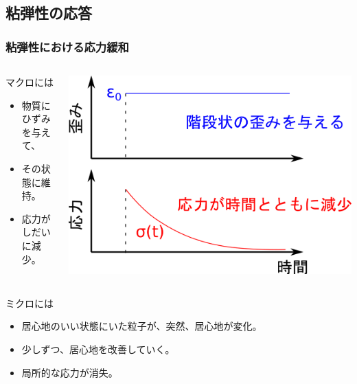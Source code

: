\documentclass[unicode,12pt]{beamer}%
\begin{document}
\subsection{粘弾性の応答}
\begin{frame}
	\frametitle{粘弾性における応力緩和}
		\begin{columns}[T, onlytextwidth]
				\begin{block}{マクロには}
					\begin{itemize}
						\item 物質にひずみを与えて、
						\item その状態に維持。
						\item 応力がしだいに減少。
					\end{itemize}
				\end{block}
			\includegraphics[width=\textwidth]{stress_relux.png}
		\end{columns}
		
		\begin{exampleblock}{ミクロには}
			\begin{itemize}
				\item 居心地のいい状態にいた粒子が、突然、居心地が変化。
				\item 少しずつ、\alert{居心地を改善}していく。
				\item 局所的な応力が消失。
			\end{itemize}
		\end{exampleblock}
\end{frame}
\end{document}
